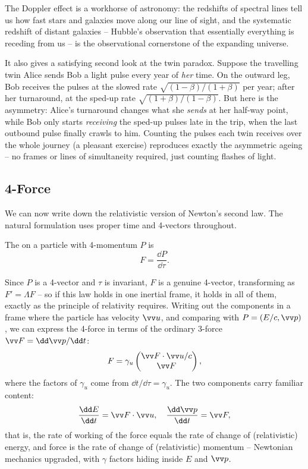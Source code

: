 The Doppler effect is a workhorse of astronomy: the redshifts of spectral lines tell us how fast stars and galaxies move along our line of sight, and the systematic redshift of distant galaxies -- Hubble's observation that essentially everything is receding from us -- is the observational cornerstone of the expanding universe.

It also gives a satisfying second look at the twin paradox. Suppose the travelling twin Alice sends Bob a light pulse every year of \emph{her} time. On the outward leg, Bob receives the pulses at the slowed rate $\sqrt{(1-\beta)/(1+\beta)}$ per year; after her turnaround, at the sped-up rate $\sqrt{(1+\beta)/(1-\beta)}$. But here is the asymmetry: Alice's turnaround changes what she \emph{sends} at her half-way point, while Bob only starts \emph{receiving} the sped-up pulses late in the trip, when the last outbound pulse finally crawls to him. Counting the pulses each twin receives over the whole journey (a pleasant exercise) reproduces exactly the asymmetric ageing -- no frames or lines of simultaneity required, just counting flashes of light.

\subsection{4-Force}

We can now write down the relativistic version of Newton's second law. The natural formulation uses proper time and 4-vectors throughout.

\begin{definition}[4-Force]
	The  on a particle with 4-momentum $P$ is
	$$
	F = \frac{\dd P}{\dd\tau}.
	$$
\end{definition}

Since $P$ is a 4-vector and $\tau$ is invariant, $F$ is a genuine 4-vector, transforming as $F' = \Lambda F$ -- so if this law holds in one inertial frame, it holds in all of them, exactly as the principle of relativity requires. Writing out the components in a frame where the particle has velocity $\vv u$, and comparing with $P = (E/c, \vv p)$, we can express the 4-force in terms of the ordinary 3-force $\vv F = \dd\vv p/\dd t$:
$$
F = \gamma_u \begin{pmatrix}
	\vv F \cdot \vv u / c \\
	\vv F
\end{pmatrix},
$$
where the factors of $\gamma_u$ come from $\dd t/\dd\tau = \gamma_u$. The two components carry familiar content:
$$
\frac{\dd E}{\dd t} = \vv F \cdot \vv u, \quad \frac{\dd \vv p}{\dd t} = \vv F,
$$
that is, the rate of working of the force equals the rate of change of (relativistic) energy, and force is the rate of change of (relativistic) momentum -- Newtonian mechanics upgraded, with $\gamma$ factors hiding inside $E$ and $\vv p$.

